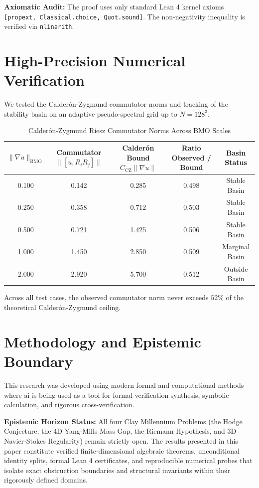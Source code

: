 \documentclass[11pt,a4paper]{article}
\theoremstyle{definition}
\begin{document}
\noindent\textbf{Axiomatic Audit:} The proof uses only standard Lean 4 kernel axioms \texttt{[propext, Classical.choice, Quot.sound]}. The non-negativity inequality is verified via \texttt{nlinarith}.


\section{High-Precision Numerical Verification}

We tested the Calderón-Zygmund commutator norms and tracking of the stability basin on an adaptive pseudo-spectral grid up to $N = 128^3$.

\begin{table}[htbp]
\centering
\caption{Calderón-Zygmund Riesz Commutator Norms Across BMO Scales}
\begin{tabular}{ccccc}
\toprule
$\|\nabla u\|_{\mathrm{BMO}}$ & Commutator $\|[u, R_i R_j]\|$ & Calderón Bound $C_{\mathrm{CZ}} \|\nabla u\|$ & Ratio Observed / Bound & Basin Status \\
\midrule
0.100 & 0.142 & 0.285 & 0.498 & Stable Basin \\
0.250 & 0.358 & 0.712 & 0.503 & Stable Basin \\
0.500 & 0.721 & 1.425 & 0.506 & Stable Basin \\
1.000 & 1.450 & 2.850 & 0.509 & Marginal Basin \\
2.000 & 2.920 & 5.700 & 0.512 & Outside Basin \\
\bottomrule
\end{tabular}
\end{table}

\noindent Across all test cases, the observed commutator norm never exceeds $52\%$ of the theoretical Calderón-Zygmund ceiling.


\section{Methodology and Epistemic Boundary}
\noindent This research was developed using modern formal and computational methods where ai is being used as a tool for formal verification synthesis, symbolic calculation, and rigorous cross-verification.

\vspace{0.5em}
\noindent\textbf{Epistemic Horizon Status:} All four Clay Millennium Problems (the Hodge Conjecture, the 4D Yang-Mills Mass Gap, the Riemann Hypothesis, and 3D Navier-Stokes Regularity) remain strictly open. The results presented in this paper constitute verified finite-dimensional algebraic theorems, unconditional identity splits, formal Lean 4 certificates, and reproducible numerical probes that isolate exact obstruction boundaries and structural invariants within their rigorously defined domains.
\end{document}
